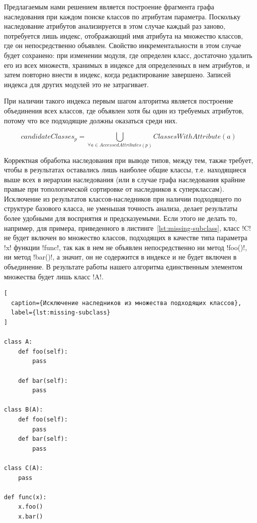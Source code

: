 Предлагаемым нами решением является построение фрагмента графа наследования при
каждом поиске классов по атрибутам параметра. Поскольку наследование атрибутов
анализируется в этом случае каждый раз заново, потребуется лишь индекс,
отображающий имя атрибута на множество классов, где он непосредственно объявлен.
Свойство инкрементальности в этом случае будет сохранено: при
изменении модуля, где определен класс, достаточно удалить его из всех множеств,
хранимых в индексе для определенных в нем атрибутов, и затем повторно внести в
индекс, когда редактирование завершено. Записей индекса для других модулей это
не затрагивает.

При наличии такого индекса первым шагом алгоритма является построение
объединения всех классов, где объявлен хотя бы один из требуемых атрибутов,
потому что все подходящие должны оказаться среди них.

\[
  candidateClasses_p = \bigcup_{\forall{a} \in AccessedAttributes(p)}
  ClassesWithAttribute(a)
\]

Корректная обработка наследования при выводе типов, между тем, также требует,
чтобы в результатах оставались лишь наиболее общие классы, т.е. находящиеся выше
всех в иерархии наследования (или в случае графа наследования крайние правые при
топологической сортировке от наследников к суперклассам). Исключение из
результатов классов-наследников при наличии подходящего по структуре базового
класса, не уменьшая точность анализа, делает результаты более удобными для
восприятия и предсказуемыми. Если этого не делать то, например, для
примера, приведенного в листинге~\ref{lst:missing-subclass}, класс !C! не будет
включен во множество классов, подходящих в качестве типа параметра !x! функции
!func!, так как в нем не объявлен непосредственно ни метод !foo()!, ни метод
!bar()!, а значит, он не содержится в индексе и не будет включен в объединение. В
результате работы нашего алгоритма единственным элементом множества будет лишь
класс !A!.

\begin{lstlisting}[
  caption={Исключение наследников из множества подходящих классов},
  label={lst:missing-subclass}
]

class A:
    def foo(self):
        pass

    def bar(self):
        pass

class B(A):
    def foo(self):
        pass
    def bar(self):
        pass

class C(A):
    pass

def func(x):
    x.foo()
    x.bar()
    
\end{lstlisting}


